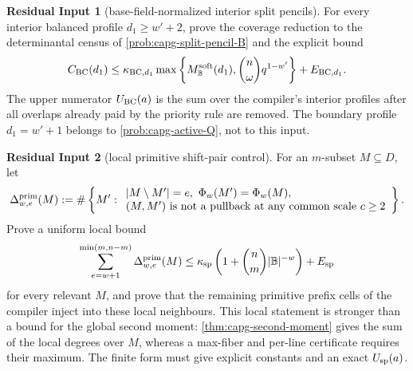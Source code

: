 \documentclass[11pt]{article}
\theoremstyle{definition}
\newtheorem{residualinput}[residualinput]{Residual Input}
\theoremstyle{remark}
\newcommand{\B}{\mathbb{B}}
\begin{document}
\begin{residualinput}[base-field-normalized interior split pencils]\label{prob:capg-active-BC}
For every interior balanced profile $d_1\ge w'+2$, prove the coverage reduction to the determinantal census of \cref{prob:capg-split-pencil-B} and the explicit bound
\[
C_{\rm BC}(d_1)
\le
\kappa_{{\rm BC},d_1}
\max\left\{M_{\B}^{\rm soft}(d_1),\binom n\omega q^{1-w'}\right\}
+E_{{\rm BC},d_1}.
\]
The upper numerator $U_{\rm BC}(a)$ is the sum over the compiler's interior profiles after all overlaps already paid by the priority rule are removed.  The boundary profile $d_1=w'+1$ belongs to \cref{prob:capg-active-Q}, not to this input.
\end{residualinput}

\begin{residualinput}[local primitive shift-pair control]\label{prob:capg-active-shiftpairs}
For an $m$-subset $M\subseteq D$, let
\[
\Delta^{\rm prim}_{w,e}(M)
:=
\#\left\{M':\begin{array}{l}
|M\setminus M'|=e,\ \Phi_w(M')=\Phi_w(M),\\
(M,M')\text{ is not a pullback at any common scale }c\ge2
\end{array}\right\}.
\]
Prove a uniform local bound
\[
        \sum_{e=w+1}^{\min(m,n-m)}\Delta^{\rm prim}_{w,e}(M)
        \le
        \kappa_{\rm sp}\left(1+\binom nm|\B|^{-w}\right)+E_{\rm sp}
\]
for every relevant $M$, and prove that the remaining primitive prefix cells of the compiler inject into these local neighbours.  This local statement is stronger than a bound for the global second moment: \cref{thm:capg-second-moment} gives the sum of the local degrees over $M$, whereas a max-fiber and per-line certificate requires their maximum.  The finite form must give explicit constants and an exact $U_{\rm sp}(a)$.
\end{residualinput}
\end{document}
